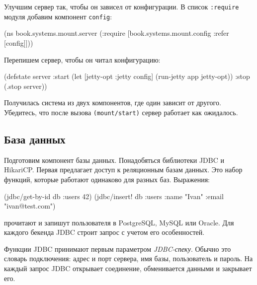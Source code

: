 
Улучшим сервер так, чтобы он зависел от конфигурации. В список \verb|:require|
модуля добавим компонент \verb|config|:

\begin{english}
  \begin{clojure}
(ns book.systems.mount.server
 (:require
  [book.systems.mount.config :refer [config]]))
  \end{clojure}
\end{english}

\noindent
Перепишем сервер, чтобы он читал конфигурацию:

\begin{english}
  \begin{clojure}
(defstate server
  :start
  (let [{jetty-opt :jetty} config]
    (run-jetty app jetty-opt))
  :stop (.stop server))
  \end{clojure}
\end{english}

Получилась система из двух компонентов, где один зависит от другого. Убедитесь,
что после вызова \verb|(mount/start)| сервер работает как ожидалось.

\subsection{База данных}


Подготовим компонент базы данных. Понадобяться библиотеки
JDBC и
HikariCP. Первая предлагает доступ
к реляционным базам данных. Это набор функций, которые работают одинаково для
разных баз. Выражения:

\begin{english}
  \begin{clojure}
(jdbc/get-by-id db :users 42)
(jdbc/insert! db :users {:name "Ivan" :email "ivan@test.com"})
  \end{clojure}
\end{english}

\noindent
прочитают и запишут пользователя в PostgreSQL, MySQL или Oracle. Для каждого
бекенда JDBC строит запрос с учетом его особенностей.


Функции JDBC принимают первым параметром \emph{JDBC-спеку}. Обычно это словарь
подключения: адрес и порт сервера, имя базы, пользователь и пароль. На каждый
запрос JDBC открывает соединение, обменивается данными и закрывает его.

